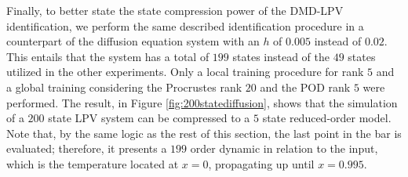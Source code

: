 Finally, to better state the state compression power of the DMD-LPV identification, we perform the same described identification procedure in a counterpart of the diffusion equation system with an $h$ of $0.005$ instead of $0.02$.
%
This entails that the system has a total of $199$ states instead of the $49$ states utilized in the other experiments.
%
Only a local training procedure for rank $5$ and a global training considering the Procrustes rank $20$ and the POD rank $5$ were performed.
%
The result, in Figure \ref{fig:200statediffusion}, shows that the simulation of a $200$ state LPV system can be compressed to a $5$ state reduced-order model.
%
Note that, by the same logic as the rest of this section, the last point in the bar is evaluated; therefore, it presents a $199$ order dynamic in relation to the input, which is the temperature located at $x = 0$, propagating up until $x = 0.995$.



